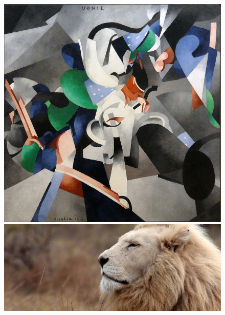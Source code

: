 \documentclass[17pt]{extarticle}
\begin{document}
\begin{figure}
\begin{minipage}{.5\textwidth}
  	\includegraphics[scale=0.4]{polyfoxstyle.png}
  	\includegraphics[scale=0.3]{lion.png}
\end{minipage}
\end{figure}
\end{document}
